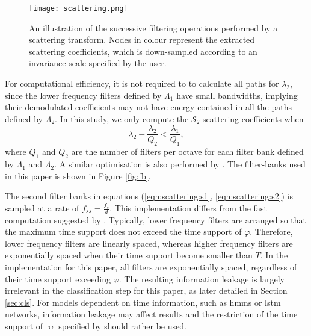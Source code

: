 {\begin{figure}[h]
    \centering
    \texttt{[image: scattering.png]}
    \caption[An illustration of the successive filtering operations performed by a scattering transform.]{An illustration of the successive filtering operations performed by a scattering transform. Nodes in colour represent the extracted scattering coefficients, which is down-sampled according to an invariance scale specified by the user.}
    \label{fig:scattering}
\end{figure}

For computational efficiency, it is not required to to calculate all paths for $\lambda_2$, since the lower frequency filters defined by $\Lambda_1$ have small bandwidths, implying their demodulated coefficients may not have energy contained in all the paths defined by $\Lambda_2$. In this study, we only compute the $\mathcal{S}_2$ scattering coefficients when 
\begin{equation}
\label{eqn:restrictlambda2}
    \lambda_2 - \frac{\lambda_2}{Q_2} <  \frac{\lambda_1}{Q_1},
\end{equation}
where $Q_1$ and $Q_2$ are the number of filters per octave for each filter bank defined by $\Lambda_1$ and $\Lambda_2$. A similar optimisation is also performed by \citet{ws_audio}. The filter-banks used in this paper is shown in Figure \ref{fig:fb}.

The second filter banks in equations (\ref{eqn:scattering:s1}, \ref{eqn:scattering:s2}) is sampled at a rate of $f_{ss} = \frac{f_s}{d}$. This implementation differs from the fast computation suggested by \citet{ws_audio}. Typically, lower frequency filters are arranged so that the maximum time support does not exceed the time support of $\varphi$. Therefore, lower frequency filters are linearly spaced, whereas higher frequency filters are exponentially spaced when their time support become smaller than $T$. In the implementation for this paper, all filters are exponentially spaced, regardless of their time support exceeding $\varphi$. The resulting information leakage is largely irrelevant in the classification step for this paper, as later detailed in Section \ref{sec:cls}. For models dependent on time information, such as \acp{hmm} or \ac{lstm} networks, information leakage may affect results and the restriction of the time support of $\uppsi$ specified by \citet{ws_audio} should rather be used.




}
